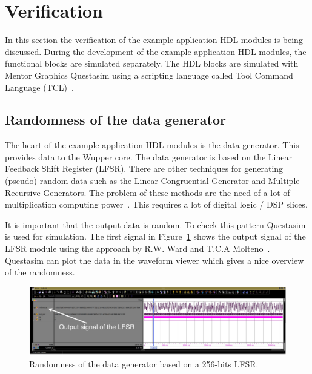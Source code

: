 \section{Verification}
In this section the verification of the example application HDL modules is being discussed. During the development of the example application HDL modules, the functional blocks are simulated separately. The HDL blocks are simulated with Mentor Graphics Questasim using a scripting language called Tool Command Language (TCL)~\cite{tcl}.

\subsection{Randomness of the data generator}
The heart of the example application HDL modules is the data generator. This provides data to the Wupper core. The data generator is based on the Linear Feedback Shift Register (LFSR). There are other techniques for generating (pseudo) random data such as the Linear Congruential Generator and Multiple Recursive Generators. The problem of these methods are the need of a lot of multiplication computing power~\cite{randomgen}. This requires a lot of digital logic / DSP slices.

It is important that the output data is random. To check this pattern Questasim is used for simulation. The first signal in Figure~\ref{fig:simapp} shows the output signal of the LFSR module using the approach by R.W. Ward and T.C.A Molteno~\cite{lfsrtable}. Questasim can plot the data in the waveform viewer which gives a nice overview of the randomness. 

\begin{figure}[h]
	\centering
	\includegraphics[width = 1 \textwidth]{figures/sim_lfsr_output.pdf}	
	\caption{Randomness of the data generator based on a 256-bits LFSR. }
	\label{fig:simapp}
\end{figure}


